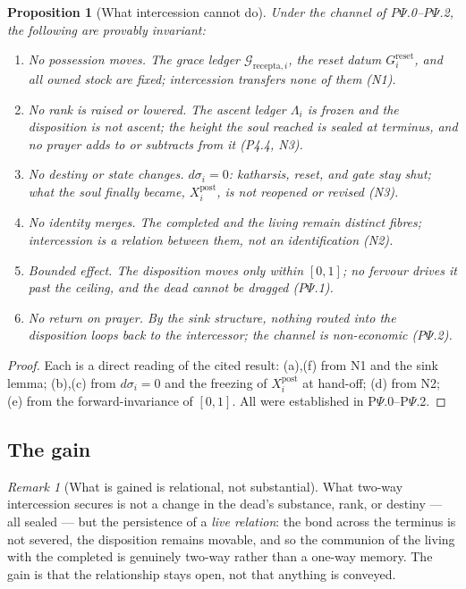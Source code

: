 \documentclass[11pt,a4paper]{article}
\theoremstyle{definition}
\theoremstyle{plain}
\newtheorem{proposition}[definition]{Proposition}
\theoremstyle{remark}
\newtheorem{remark}[definition]{Remark}
\begin{document}
\begin{proposition}[What intercession cannot do]\label{prop:limits}
Under the channel of P$\Psi$.0--P$\Psi$.2, the following are provably invariant:
\begin{enumerate}[label=\textup{(\alph*)},leftmargin=1.2cm]
\item \emph{No possession moves.} The grace ledger \(\mathcal G_{\mathrm{recepta},i}\), the reset
datum \(G_i^{\mathrm{reset}}\), and all owned stock are fixed; intercession transfers none of
them (N1).
\item \emph{No rank is raised or lowered.} The ascent ledger \(\Lambda_i\) is frozen and the
disposition is not ascent; the height the soul reached is sealed at terminus, and no prayer
adds to or subtracts from it (P4.4, N3).
\item \emph{No destiny or state changes.} \(d\sigma_i=0\): katharsis, reset, and gate stay
shut; what the soul finally became, \(X_i^{\mathrm{post}}\), is not reopened or revised (N3).
\item \emph{No identity merges.} The completed and the living remain distinct fibres;
intercession is a relation between them, not an identification (N2).
\item \emph{Bounded effect.} The disposition moves only within \([0,1]\); no fervour drives it
past the ceiling, and the dead cannot be dragged (P$\Psi$.1).
\item \emph{No return on prayer.} By the sink structure, nothing routed into the disposition
loops back to the intercessor; the channel is non-economic (P$\Psi$.2).
\end{enumerate}
\end{proposition}

\begin{proof}
Each is a direct reading of the cited result: (a),(f) from N1 and the sink lemma; (b),(c) from
\(d\sigma_i=0\) and the freezing of \(X_i^{\mathrm{post}}\) at hand-off; (d) from N2; (e) from
the forward-invariance of \([0,1]\). All were established in P$\Psi$.0--P$\Psi$.2. \qedhere
\end{proof}

\subsection{The gain}

\begin{remark}[What is gained is relational, not substantial]\label{rem:gain}
What two-way intercession secures is not a change in the dead's substance, rank, or destiny ---
all sealed --- but the persistence of a \emph{live relation}: the bond across the terminus is
not severed, the disposition remains movable, and so the communion of the living with the
completed is genuinely two-way rather than a one-way memory. The gain is that the relationship
stays open, not that anything is conveyed.
\end{remark}
\end{document}
